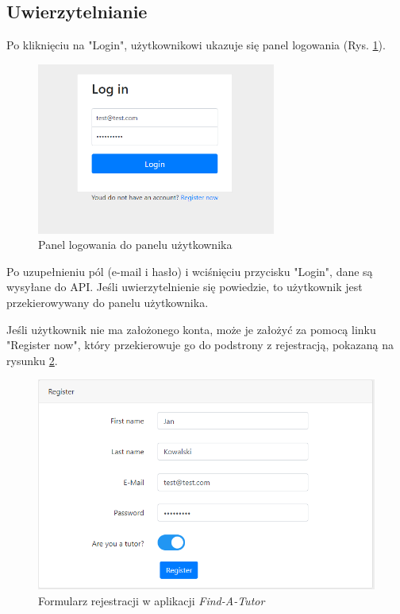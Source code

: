 \documentclass[12pt]{article}
\numberwithin{figure}{section}
\begin{document}
\begin{sloppypar}
\subsection{Uwierzytelnianie}
Po kliknięciu na "Login", użytkownikowi ukazuje się panel logowania (Rys. \ref{fig:login}). 

\begin{figure}[!htbp] 
    \centering
    \includegraphics[width=0.7\textwidth]{images/chapter_4/login.png}
    \caption{Panel logowania do panelu użytkownika}
    \label{fig:login}
\end{figure}

Po uzupełnieniu pól (e-mail i hasło) i wciśnięciu przycisku "Login", dane są wysyłane do API. Jeśli uwierzytelnienie się powiedzie, to użytkownik jest przekierowywany do panelu użytkownika.

Jeśli użytkownik nie ma założonego konta, może je założyć za pomocą linku "Register now", który przekierowuje go do podstrony z rejestracją, pokazaną na rysunku \ref{fig:register}.

\begin{figure}[!htbp] 
    \centering
    \includegraphics[width=1\textwidth]{images/chapter_4/register.png}
    \caption{Formularz rejestracji w aplikacji \textit{Find-A-Tutor}}
    \label{fig:register}
\end{figure}


\end{sloppypar}
\end{document}
